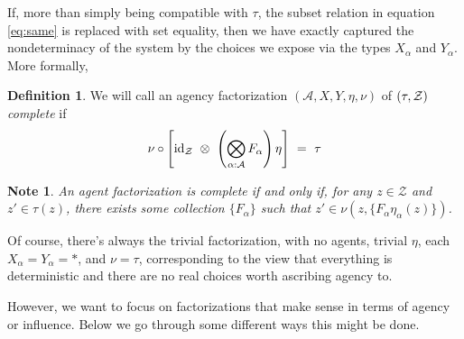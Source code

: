 \documentclass{article}
\newtheorem{note}{Note}
\theoremstyle{definition}
\newtheorem{defn}{Definition}
\newcommand{\Z}{\mathcal Z}
\begin{document}
	If, more than simply being compatible with $\tau$, the subset relation in equation \eqref{eq:same} is replaced with set equality, then we have exactly captured the nondeterminacy of the system by the choices we expose via the types $X_\alpha$ and $Y_\alpha$. More formally,
	
	\vspace{1em}
	\begin{defn}
		We will call an agency factorization $(\mathcal A, X, Y, \eta, \nu)$ of $(\tau, \cal Z)$ \emph{complete} if
		\begin{equation*} 
		\nu \circ \left[ \mathrm{id}_\Z  ~\otimes~ \left(\bigotimes_{\alpha : \cal A} F_\alpha \right) \eta \right] ~=~\tau
		\end{equation*} 
	\end{defn}

	\vspace{1em}
	\begin{note}
		An agent factorization is complete if and only if, for any $z \in \Z$ and $z' \in \tau(z)$, there exists some collection $\{F_\alpha\}$ such that $z' \in \nu(z, \{F_\alpha\eta_\alpha(z)\})$.
	\end{note}


	Of course, there's always the trivial factorization, with no agents, trivial $\eta$, each $X_\alpha = Y_\alpha = *$, and $\nu = \tau$, corresponding to the view that everything is deterministic and there are no real choices worth ascribing agency to. 
	
	
	However, we want to focus on factorizations that make sense in terms of agency or influence.
	Below we go through some different ways this might be done.
\end{document}
